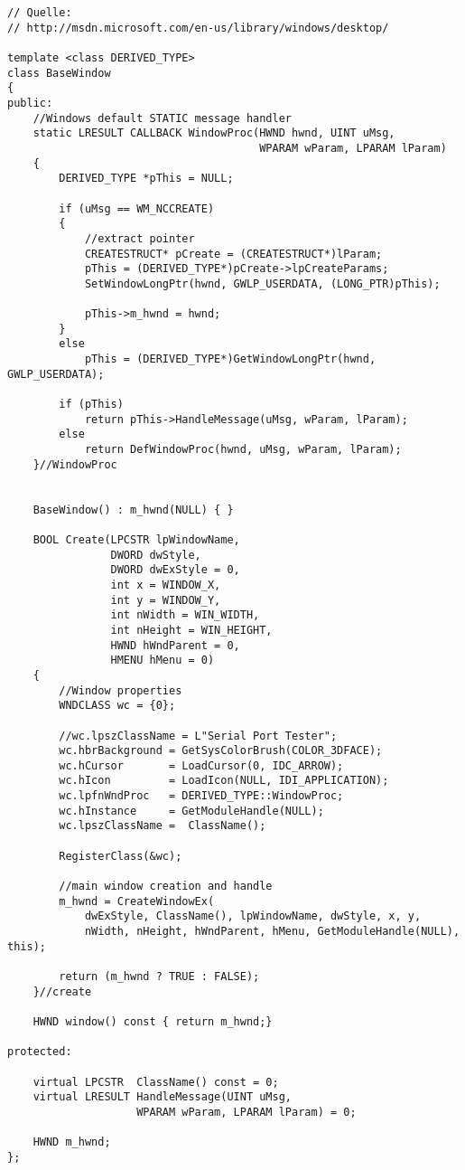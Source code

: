 \begin{lstlisting}	
// Quelle:
// http://msdn.microsoft.com/en-us/library/windows/desktop/

template <class DERIVED_TYPE> 
class BaseWindow
{
public:
	//Windows default STATIC message handler
	static LRESULT CALLBACK WindowProc(HWND hwnd, UINT uMsg,
                                       WPARAM wParam, LPARAM lParam)
	{
		DERIVED_TYPE *pThis = NULL;

		if (uMsg == WM_NCCREATE)
		{
			//extract pointer
			CREATESTRUCT* pCreate = (CREATESTRUCT*)lParam;
			pThis = (DERIVED_TYPE*)pCreate->lpCreateParams;
			SetWindowLongPtr(hwnd, GWLP_USERDATA, (LONG_PTR)pThis);

			pThis->m_hwnd = hwnd;
		}
		else
			pThis = (DERIVED_TYPE*)GetWindowLongPtr(hwnd, GWLP_USERDATA);

		if (pThis)
			return pThis->HandleMessage(uMsg, wParam, lParam);
		else
			return DefWindowProc(hwnd, uMsg, wParam, lParam);
	}//WindowProc

    
	BaseWindow() : m_hwnd(NULL) { }

	BOOL Create(LPCSTR lpWindowName,
				DWORD dwStyle,
				DWORD dwExStyle = 0,
				int x = WINDOW_X,
				int y = WINDOW_Y,
				int nWidth = WIN_WIDTH,
				int nHeight = WIN_HEIGHT,
				HWND hWndParent = 0,
				HMENU hMenu = 0)
    {
		//Window properties
		WNDCLASS wc = {0};
		
		//wc.lpszClassName = L"Serial Port Tester";
		wc.hbrBackground = GetSysColorBrush(COLOR_3DFACE);
		wc.hCursor       = LoadCursor(0, IDC_ARROW);
		wc.hIcon		 = LoadIcon(NULL, IDI_APPLICATION);
		wc.lpfnWndProc   = DERIVED_TYPE::WindowProc;
		wc.hInstance     = GetModuleHandle(NULL);
		wc.lpszClassName =  ClassName();

		RegisterClass(&wc);

		//main window creation and handle
		m_hwnd = CreateWindowEx(
			dwExStyle, ClassName(), lpWindowName, dwStyle, x, y,
			nWidth, nHeight, hWndParent, hMenu, GetModuleHandle(NULL), this);

        return (m_hwnd ? TRUE : FALSE);
    }//create

	HWND window() const { return m_hwnd;}

protected:

    virtual LPCSTR  ClassName() const = 0;
    virtual LRESULT HandleMessage(UINT uMsg,
                    WPARAM wParam, LPARAM lParam) = 0;

    HWND m_hwnd;
};
\end{lstlisting}	


